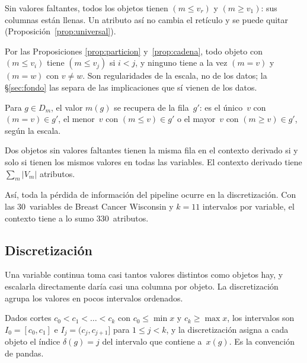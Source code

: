 \begin{corolario}\label{cor:universal}
Sin valores faltantes, todos los objetos tienen $(m{\le}v_r)$ y $(m{\ge}v_1)$: sus columnas están llenas. Un atributo así no cambia el retículo y se puede quitar (Proposición~\ref{prop:universal}).
\end{corolario}

\begin{observacion}\label{obs:fondo}
Por las Proposiciones \ref{prop:particion} y~\ref{prop:cadena}, todo objeto con $(m{\le}v_i)$ tiene $(m{\le}v_j)$ si $i < j$, y ninguno tiene a la vez $(m{=}v)$ y $(m{=}w)$ con $v \ne w$. Son regularidades de la escala, no de los datos; la \S\ref{sec:fondo} las separa de las implicaciones que sí vienen de los datos.
\end{observacion}

\begin{proposicion}\label{prop:sin-perdida}
Para $g \in D_m$, el valor $m(g)$ se recupera de la fila~$g'$: es el único~$v$ con $(m{=}v) \in g'$, el menor~$v$ con $(m{\le}v) \in g'$ o el mayor~$v$ con $(m{\ge}v) \in g'$, según la escala.
\end{proposicion}

\begin{corolario}\label{cor:filas}
Dos objetos sin valores faltantes tienen la misma fila en el contexto derivado si y solo si tienen los mismos valores en todas las variables. El contexto derivado tiene $\sum_{m} \lvert V_m \rvert$ atributos.
\end{corolario}

Así, toda la pérdida de información del pipeline ocurre en la discretización. Con las 30~variables de Breast Cancer Wisconsin y $k = 11$ intervalos por variable, el contexto tiene a lo sumo 330~atributos.


\subsection{Discretización}
\label{sec:discretizacion}

Una variable continua toma casi tantos valores distintos como objetos hay, y escalarla directamente daría casi una columna por objeto. La discretización agrupa los valores en pocos intervalos ordenados.

\begin{definicion}\label{def:discretizacion}
Dados cortes $c_0 < c_1 < \dots < c_k$ con $c_0 \le \min x$ y $c_k \ge \max x$, los intervalos son $I_0 = [c_0, c_1]$ e $I_j = (c_j, c_{j+1}]$ para $1 \le j < k$, y la discretización asigna a cada objeto el índice $\delta(g) = j$ del intervalo que contiene a~$x(g)$. Es la convención de pandas.
\end{definicion}

